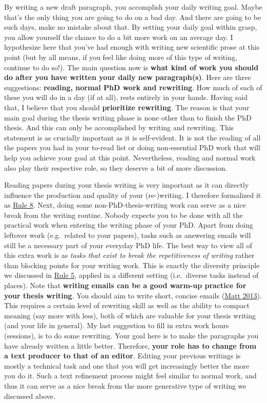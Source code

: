 \documentclass[
  12pt,
  oneside]{book}
\begin{document}
By writing a new draft paragraph, you accomplish your daily writing goal.
Maybe that's the only thing you are going to do on a bad day.
And there are going to be such days, make no mistake about that.
By setting your daily goal within grasp, you allow yourself the chance to do a bit more work on an average day.
I hypothesize here that you've had enough with writing new scientific prose at this point (but by all means, if you feel like doing more of this type of writing, continue to do so!).
The main question now is \textbf{what kind of work you should do after you have written your daily new paragraph(s)}.
Here are three suggestions: \textbf{reading, normal PhD work and rewriting}.
How much of each of these you will do in a day (if at all), rests entirely in your hands.
Having said that, I believe that you should \textbf{prioritize rewriting}.
The reason is that your main goal during the thesis writing phase is none other than to finish the PhD thesis.
And this can only be accomplished by writing and rewriting.
This statement is as crucially important as it is self-evident.
It is not the reading of all the papers you had in your to-read list or doing non-essential PhD work that will help you achieve your goal at this point.
Nevertheless, reading and normal work also play their respective role, so they deserve a bit of more discussion.

Reading papers during your thesis writing is very important as it can directly influence the production and quality of your (re-)writing.
I therefore formalized it as \protect\hyperlink{rule8}{Rule 8}.
Next, doing some non-PhD-thesis-writing work can serve as a nice break from the writing routine.
Nobody expects you to be done with all the practical work when entering the writing phase of your PhD.
Apart from doing leftover work (e.g.~related to your papers), tasks such as answering emails will still be a necessary part of your everyday PhD life.
The best way to view all of this extra work is as \emph{tasks that exist to break the repetitiveness of writing} rather than blocking points for your writing work.
This is exactly the diversity principle we discussed in \protect\hyperlink{rule5}{Rule 5}, applied in a different setting (i.e.~diverse tasks instead of places).
Note that \textbf{writing emails can be a good warm-up practice for your thesis writing}.
You should aim to write short, concise emails (\protect\hyperlink{ref-email-MattMight}{Matt 2013}).
This requires a certain level of rewriting skill as well as the ability to compact meaning (say more with less), both of which are valuable for your thesis writing (and your life in general).
My last suggestion to fill in extra work hours (sessions), is to do some rewriting.
Your goal here is to make the paragraphs you have already written a little better.
Therefore, \textbf{your role has to change from a text producer to that of an editor}.
Editing your previous writings is mostly a technical task and one that you will get increasingly better the more you do it.
Such a text refinement process might feel similar to normal work, and thus it can serve as a nice break from the more generative type of writing we discussed above.
\end{document}
